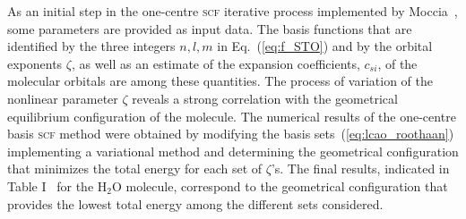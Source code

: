  
As an initial step in the one-centre \textsc{scf} iterative process
implemented by
Moccia~\cite{Moccia_JCP_2164,Moccia_JCP_2176,Moccia_1964}, some
parameters are provided as input data. The basis functions that are
identified by the three integers $n,l,m$ in Eq.~(\ref{eq:f_STO}) and
by the orbital exponents $\zeta$, as well as an estimate of the
expansion coefficients, $c_{si}$, of the molecular orbitals are among
these quantities. The process of variation of the nonlinear parameter
$\zeta$ reveals a strong correlation with the geometrical equilibrium
configuration of the molecule. The numerical results of the one-centre
basis \textsc{scf} method were obtained by modifying the basis
sets~(\ref{eq:lcao_roothaan}) implementing a variational method and
determining the geometrical configuration that minimizes the total
energy for each set of $\zeta$'s. The final results, indicated in
Table I~\cite{Moccia_1964} for the H$_{2}$O molecule, correspond to
the geometrical configuration that provides the lowest total energy
among the different sets considered.









